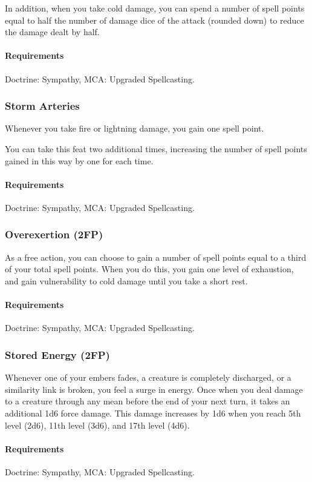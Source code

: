     In addition, when you take cold damage, you can spend a number of spell points equal to half the number of damage dice of the attack (rounded down) to reduce the damage dealt by half.
    \paragraph{Requirements} Doctrine: Sympathy, MCA: Upgraded Spellcasting.
\subsubsection{Storm Arteries} \label{feat::stormarteries}
    Whenever you take fire or lightning damage, you gain one spell point.

    You can take this feat two additional times, increasing the number of spell points gained in this way by one for each time.
    \paragraph{Requirements} Doctrine: Sympathy, MCA: Upgraded Spellcasting.
\subsubsection{Overexertion (2FP)} \label{feat::overexertion}
    As a free action, you can choose to gain a number of spell points equal to a third of your total spell points.
    When you do this, you gain one level of exhaustion, and gain vulnerability to cold damage until you take a short rest.
    \paragraph{Requirements} Doctrine: Sympathy, MCA: Upgraded Spellcasting.
\subsubsection{Stored Energy (2FP)} \label{feat::storedenergy}
    Whenever one of your embers fades, a creature is completely discharged, or a similarity link is broken, you feel a surge in energy.
    Once when you deal damage to a creature through any mean before the end of your next turn, it takes an additional 1d6 force damage.
    This damage increases by 1d6 when you reach 5th level (2d6), 11th level (3d6), and 17th level (4d6).
    \paragraph{Requirements} Doctrine: Sympathy, MCA: Upgraded Spellcasting.

